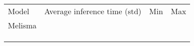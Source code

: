 \begin{tabular}{l|lll}
    Model & Average inference time (std) & Min & Max \\
    Melisma & & & \\
    \textcite{chen2021attend} & & & \\
    \textcite{mcleod2021modular} & & & \\
    \textcite{micchi2020not} & & & \\
\end{tabular}

